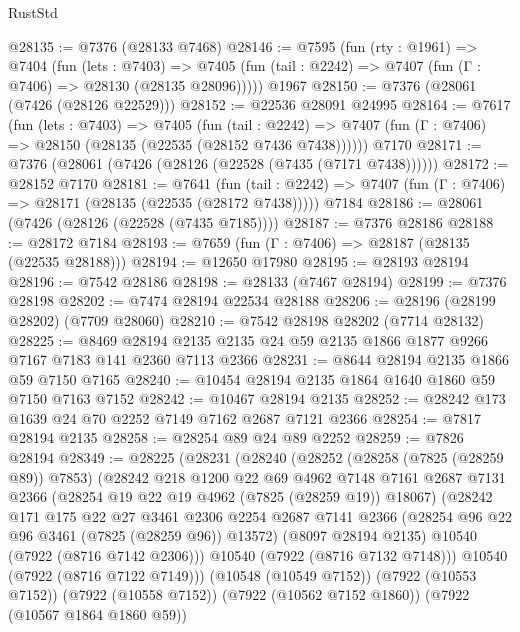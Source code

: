 \begin{lexlean}{RustStd}
\begin{coremodule}
@28135 := @7376 (@28133 @7468)
@28146 := @7595
    (fun (rty : @1961) =>
    @7404
      (fun (lets : @7403) =>
      @7405 (fun (tail : @2242) => @7407 (fun (Γ : @7406) => @28130 (@28135 @28096)))))
    @1967
@28150 := @7376 (@28061 (@7426 (@28126 @22529)))
@28152 := @22536 @28091 @24995
@28164 := @7617
    (fun (lets : @7403) =>
    @7405
      (fun (tail : @2242) =>
      @7407 (fun (Γ : @7406) => @28150 (@28135 (@22535 (@28152 @7436 @7438))))))
    @7170
@28171 := @7376 (@28061 (@7426 (@28126 (@22528 (@7435 (@7171 @7438))))))
@28172 := @28152 @7170
@28181 := @7641
    (fun (tail : @2242) => @7407 (fun (Γ : @7406) => @28171 (@28135 (@22535 (@28172 @7438)))))
    @7184
@28186 := @28061 (@7426 (@28126 (@22528 (@7435 @7185))))
@28187 := @7376 @28186
@28188 := @28172 @7184
@28193 := @7659 (fun (Γ : @7406) => @28187 (@28135 (@22535 @28188)))
@28194 := @12650 @17980
@28195 := @28193 @28194
@28196 := @7542 @28186
@28198 := @28133 (@7467 @28194)
@28199 := @7376 @28198
@28202 := @7474 @28194 @22534 @28188
@28206 := @28196 (@28199 @28202) (@7709 @28060)
@28210 := @7542 @28198 @28202 (@7714 @28132)
@28225 := @8469
    @28194
    @2135
    @2135
    @24
    @59
    @2135
    @1866
    @1877
    @9266
    @7167
    @7183
    @141
    @2360
    @7113
    @2366
@28231 := @8644 @28194 @2135 @1866 @59 @7150 @7165
@28240 := @10454 @28194 @2135 @1864 @1640 @1860 @59 @7150 @7163 @7152
@28242 := @10467 @28194 @2135
@28252 := @28242 @173 @1639 @24 @70 @2252 @7149 @7162 @2687 @7121 @2366
@28254 := @7817 @28194 @2135
@28258 := @28254 @89 @24 @89 @2252
@28259 := @7826 @28194
@28349 := @28225
    (@28231
      (@28240
        (@28252
          (@28258 (@7825 (@28259 @89)) @7853)
          (@28242
            @218
            @1200
            @22
            @69
            @4962
            @7148
            @7161
            @2687
            @7131
            @2366
            (@28254 @19 @22 @19 @4962 (@7825 (@28259 @19)) @18067)
            (@28242
              @171
              @175
              @22
              @27
              @3461
              @2306
              @2254
              @2687
              @7141
              @2366
              (@28254 @96 @22 @96 @3461 (@7825 (@28259 @96)) @13572)
              (@8097 @28194 @2135)
              @10540
              (@7922 (@8716 @7142 @2306)))
            @10540
            (@7922 (@8716 @7132 @7148)))
          @10540
          (@7922 (@8716 @7122 @7149)))
        (@10548 (@10549 @7152))
        (@7922 (@10553 @7152))
        (@7922 (@10558 @7152))
        (@7922 (@10562 @7152 @1860))
        (@7922 (@10567 @1864 @1860 @59))

\end{coremodule}
\end{lexlean}
